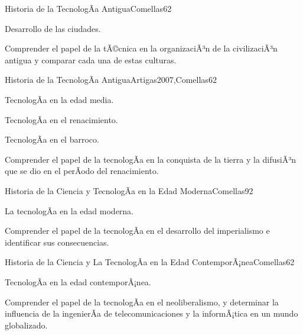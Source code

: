 \begin{syllabus}
\begin{unit}{Historia de la TecnologÃ­a Antigua}{Comellas}{6}{2}
\begin{topics}
    \item Desarrollo de las ciudades.
\end{topics}
\begin{unitgoals}
    \item Comprender el papel de la tÃ©cnica en la organizaciÃ³n de la civilizaciÃ³n antigua y comparar cada una de estas culturas.
\end{unitgoals}
\end{unit}

\begin{unit}{Historia de la TecnologÃ­a Antigua}{Artigas2007,Comellas}{6}{2}
\begin{topics}
    \item TecnologÃ­a en la edad media.
    \item TecnologÃ­a en el renacimiento.
    \item TecnologÃ­a en el barroco.
\end{topics}
\begin{unitgoals}
    \item Comprender el  papel de la tecnologÃ­a en la conquista de la tierra y la difusiÃ³n que se dio en el perÃ­odo del renacimiento.
\end{unitgoals}

\end{unit}

\begin{unit}{Historia de la Ciencia y TecnologÃ­a en la Edad Moderna}{Comellas}{9}{2}
\begin{topics}
      \item {La tecnologÃ­a en la edad moderna.}
\end{topics}
\begin{unitgoals}
	\item Comprender el  papel de la tecnologÃ­a en el desarrollo del imperialismo e identificar sus consecuencias.
\end{unitgoals}
\end{unit}

\begin{unit}{Historia de la Ciencia y La TecnologÃ­a en la Edad ContemporÃ¡nea}{Comellas}{6}{2}
\begin{topics}
      \item {TecnologÃ­a en la edad contemporÃ¡nea.}
\end{topics}
\begin{unitgoals}
	\item Comprender el  papel de la tecnologÃ­a en el neoliberalismo, y determinar la influencia de la ingenierÃ­a de telecomunicaciones y la informÃ¡tica en un mundo globalizado.
\end{unitgoals}
\end{unit}


\end{syllabus}
